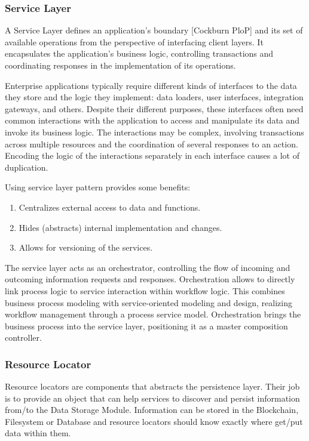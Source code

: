 \subsubsection{Service Layer}\label{sec:ServiceLayer}
A Service Layer defines an application's boundary [Cockburn PloP] and its set of available operations from the perspective of interfacing client layers. It encapsulates the application's business logic, controlling transactions and coordinating responses in the implementation of its operations.

Enterprise applications typically require different kinds of interfaces to the data they store and the logic they implement: data loaders, user interfaces, integration gateways, and others. Despite their different purposes, these interfaces often need common interactions with the application to access and manipulate its data and invoke its business logic. The interactions may be complex, involving transactions across multiple resources and the coordination of several responses to an action. Encoding the logic of the interactions separately in each interface causes a lot of duplication.

Using service layer pattern provides some benefits:

\begin{enumerate}
\item Centralizes external access to data and functions.
\item Hides (abstracts) internal implementation and changes.
\item Allows for versioning of the services.
\end{enumerate}

The service layer acts as an orchestrator, controlling the flow of incoming and outcoming information requests and responses. Orchestration allows to directly link process logic to service interaction within workflow logic. This combines business process modeling with service-oriented modeling and design, realizing workflow management through a process service model. Orchestration brings the business process into the service layer, positioning it as a master composition controller.

\subsubsection{Resource Locator}\label{sec:ResourceLocator}

Resource locators are components that abstracts the persistence layer. Their job is to provide an object that can help services to discover and persist information from/to the Data Storage Module. Information can be stored in the Blockchain, Filesystem or Database and resource locators should know exactly where get/put data within them.

